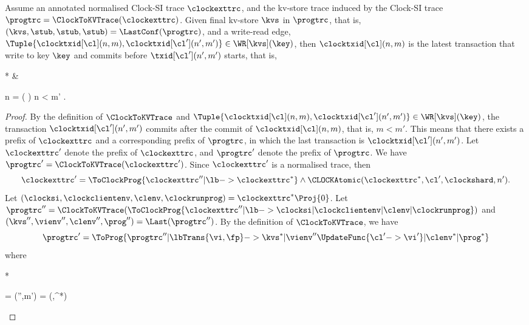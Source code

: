\begin{toappendix}
\begin{lemma}
\label{lem:clock-si-wr}
Assume an annotated normalised  Clock-SI trace \( \clockexttrc \),
and the kv-store trace induced by the Clock-SI trace \( \progtrc = \ClockToKVTrace(\clockexttrc)\).
Given final kv-store \( \kvs \) in \( \progtrc \), 
that is, \( (\kvs,\stub,\stub,\stub) = \LastConf(\progtrc) \),
and a write-read edge, \( \Tuple{ \clocktxid[\cl](n,m) , \clocktxid[\cl'](n',m') } \in \WR[\kvs](\key) \),
then \( \clocktxid[\cl](n,m) \) is the latest transaction that
write to key \( \key \) and commits before \( \txid[\cl'](n',m') \) starts,
that is, 
\begin{Formulae}*
& \begin{Formula}
    n = \Max( )
    \land n < m' .
\end{Formula}
\end{Formulae}
\end{lemma}
\begin{proof}
By the definition of \( \ClockToKVTrace \)
and \( \Tuple{ \clocktxid[\cl](n,m) , \clocktxid[\cl'](n',m') } \in \WR[\kvs](\key) \),
the transaction  \( \clocktxid[\cl'](n',m')  \) 
commits after the commit of \( \clocktxid[\cl](n,m) \), that is, \( m < m'\).
This means that there exists a prefix of \( \clockexttrc \) and a corresponding prefix of \( \progtrc \),
in which the last transaction is \(  \clocktxid[\cl'](n',m') \).
Let \( \clockexttrc' \) denote the prefix of \( \clockexttrc \),
and \( \progtrc' \) denote the prefix of \( \progtrc \).
We have \( \progtrc' = \ClockToKVTrace(\clockexttrc') \).
Since \( \clockexttrc' \) is a normalised trace, then
\[
    \clockexttrc' = \ToClockProg {\clockexttrc'' | \lb -> \clockexttrc^* } 
    \land \CLOCKAtomic(\clockexttrc^*,\cl',\clockshard,n') .
\]
Let \( (\clocksi,\clockclientenv,\clenv,\clockrunprog) = \clockexttrc^*\Proj{0} \).
Let \( \progtrc'' = \ClockToKVTrace(\ToClockProg{\clockexttrc'' | \lb -> \clocksi | \clockclientenv  | \clenv | \clockrunprog } ) \)
and \( (\kvs'',\vienv'',\clenv'',\prog'') = \Last(\progtrc'') \).
By the definition of \( \ClockToKVTrace \), we have
\[
 \progtrc' = \ToProg{ \progtrc'' | \lbTrans{\vi,\fp} -> \kvs^* | \vienv''\UpdateFunc{\cl' -> \vi'} | \clenv^* | \prog^*}
\]
where 
\begin{Formulae}*
\begin{Formula}
\vi = \ClockView(\kvs'',m') \land \fp = \ClockFp(\emptyset,\clockexttrc^*) 

\end{Formula}
\end{Formulae}
\end{proof}
\end{toappendix}
